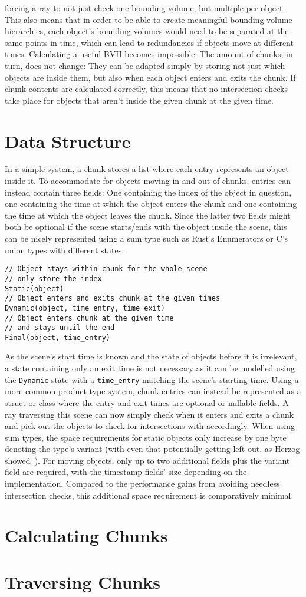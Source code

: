 forcing a ray to not just check one bounding volume, but multiple per object.
This also means that in order to be able to create meaningful bounding volume hierarchies,
each object's bounding volumes would need to be separated at the same points in time,
which can lead to redundancies if objects move at different times.
Calculating a useful BVH becomes impossible.
\newline
The amount of chunks, in turn, does not change:
They can be adapted simply by storing not just which objects are inside them,
but also when each object enters and exits the chunk.
If chunk contents are calculated correctly,
this means that no intersection checks take place for objects that aren't inside the given chunk at the given time.

\section{Data Structure}

In a simple system, a chunk stores a list where each entry represents an object inside it.
To accommodate for objects moving in and out of chunks, entries can instead contain three fields:
One containing the index of the object in question,
one containing the time at which the object enters the chunk
and one containing the time at which the object leaves the chunk.
Since the latter two fields might both be optional if the scene starts/ends with the object inside the scene,
this can be nicely represented using a sum type such as Rust's Enumerators or C's union types with different states:

\begin{verbatim}
// Object stays within chunk for the whole scene
// only store the index
Static(object)
// Object enters and exits chunk at the given times
Dynamic(object, time_entry, time_exit)
// Object enters chunk at the given time
// and stays until the end
Final(object, time_entry)
\end{verbatim}

As the scene's start time is known and the state of objects before it is irrelevant,
a state containing only an exit time is not necessary as it can be modelled using the
\verb|Dynamic| state with a \verb|time_entry| matching the scene's starting time.
Using a more common product type system, chunk entries can instead be represented as a
struct or class where the entry and exit times are optional or nullable fields.
\newline
A ray traversing this scene can now simply check when it enters and exits a chunk
and pick out the objects to check for intersections with accordingly.
When using sum types, the space requirements for static objects only increase by one byte denoting the type's variant
(with even that potentially getting left out, as Herzog showed~\cite{He23}).
For moving objects, only up to two additional fields plus the variant field are required,
with the timestamp fields' size depending on the implementation.
Compared to the performance gains from avoiding needless intersection checks,
this additional space requirement is comparatively minimal.

\section{Calculating Chunks}

\section{Traversing Chunks}
